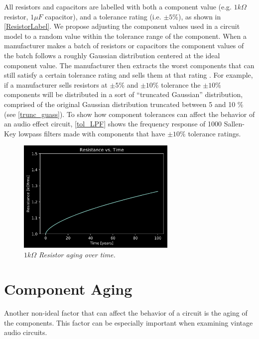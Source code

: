 \documentclass[twoside,a4paper]{article}
\begin{document}
%
All resistors and capacitors are labelled with both a
component value (e.g. $1 k\Omega$ resistor, $1 \mu F$
capacitor), and a tolerance rating (i.e. $\pm 5\%$), as
shown in \cref{ResistorLabel}. We propose adjusting the
component values used in a circuit model to a random
value within the tolerance range of the component.
\newline\newline
When a manufacturer makes a batch of resistors or capacitors
the component values of the batch follows a roughly Gaussian
distribution centered at the ideal component value. The manufacturer
then extracts the worst components that can still satisfy a certain
tolerance rating and sells them at that rating \cite{tolerance}.
For example, if a
manufacturer sells resistors at $\pm 5\%$ and $\pm 10\%$ tolerance
the $\pm 10\%$ components will be distributed in a sort of ``truncated
Gaussian'' distribution, comprised of the original Gaussian
distribution truncated between 5 and 10 \% (see \cref{trunc_guass}).
To show how component tolerances can affect the behavior of an audio
effect circuit, \cref{tol_LPF} shows the frequency response of 1000
Sallen-Key lowpass filters made with components that have $\pm 10\%$
tolerance ratings.
%
%
\begin{figure}[h]
    \center
    \includegraphics[width=3in]{../CMAging/Pics/r_time.png}
    \caption{\label{res-age}{\it $1 k\Omega$ Resistor aging over time.}}
\end{figure}
%
\section{Component Aging} \label{sec:age}
%
Another non-ideal factor that can affect the behavior of a circuit is
the aging of the components. This factor can be especially important
when examining vintage audio circuits.
%
\end{document}
